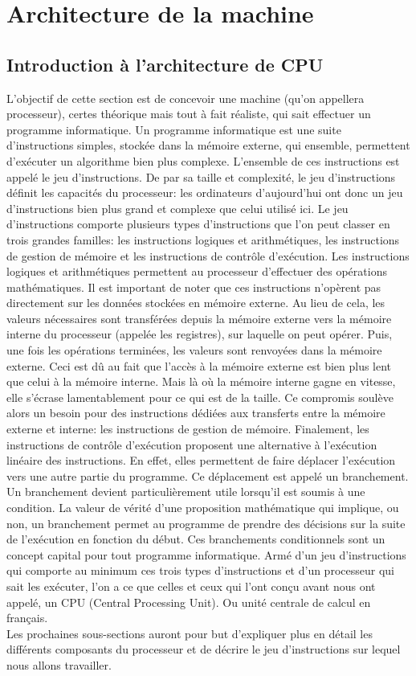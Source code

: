 \documentclass{article}
\begin{document}
\section{Architecture de la machine}
\subsection{Introduction à l'architecture de CPU}
L'objectif de cette section est de concevoir une machine (qu'on appellera processeur), certes théorique mais tout à fait réaliste, qui sait effectuer un programme informatique. Un programme informatique est une suite d'instructions simples, stockée dans la mémoire externe, qui ensemble, permettent d'exécuter un algorithme bien plus complexe. L'ensemble de ces instructions est appelé le jeu d'instructions. De par sa taille et complexité, le jeu d'instructions définit les capacités du processeur: les ordinateurs d'aujourd'hui ont donc un jeu d'instructions bien plus grand et complexe que celui utilisé ici. Le jeu d'instructions comporte plusieurs types d'instructions que l'on peut classer en trois grandes familles: les instructions logiques et arithmétiques, les instructions de gestion de mémoire et les instructions de contrôle d'exécution.
Les instructions logiques et arithmétiques permettent au processeur d'effectuer des opérations mathématiques. Il est important de noter que ces instructions n'opèrent pas directement sur les données stockées en mémoire externe. Au lieu de cela, les valeurs nécessaires sont transférées depuis la mémoire externe vers la mémoire interne du processeur (appelée les registres), sur laquelle on peut opérer. Puis, une fois les opérations terminées, les valeurs sont renvoyées dans la mémoire externe. Ceci est dû au fait que l'accès à la mémoire externe est bien plus lent que celui à la mémoire interne. Mais là où la mémoire interne gagne en vitesse, elle s'écrase lamentablement pour ce qui est de la taille. Ce compromis soulève alors un besoin pour des instructions dédiées aux transferts entre la mémoire externe et interne: les instructions de gestion de mémoire. Finalement, les instructions de contrôle d'exécution proposent une alternative à l'exécution linéaire des instructions. En effet, elles permettent de faire déplacer l'exécution vers une autre partie du programme. Ce déplacement est appelé un branchement. Un branchement devient particulièrement utile lorsqu'il est soumis à une condition. La valeur de vérité d'une proposition mathématique qui implique, ou non, un branchement permet au programme de prendre des décisions sur la suite de l'exécution en fonction du début. Ces branchements conditionnels sont un concept capital pour tout programme informatique. Armé d'un jeu d'instructions qui comporte au minimum ces trois types d'instructions et d'un processeur qui sait les exécuter, l'on a ce que celles et ceux qui l'ont conçu avant nous ont appelé, un CPU (Central Processing Unit). Ou unité centrale de calcul en français.\\
Les prochaines sous-sections auront pour but d'expliquer plus en détail les différents composants du processeur et de décrire le jeu d'instructions sur lequel nous allons travailler.
\pagebreak
\end{document}
